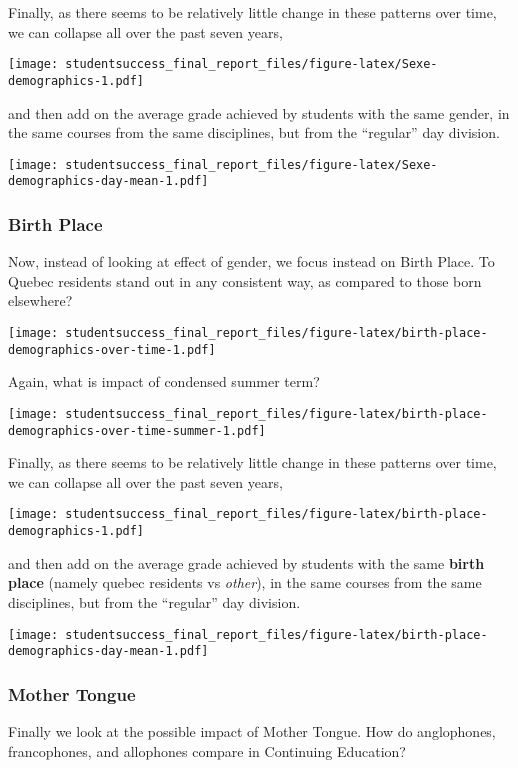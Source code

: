 \documentclass[]{book}
\theoremstyle{definition}
\theoremstyle{definition}
\theoremstyle{remark}
\begin{document}
Finally, as there seems to be relatively little change in these patterns
over time, we can collapse all over the past seven years,

\texttt{[image: studentsuccess\_final\_report\_files/figure-latex/Sexe-demographics-1.pdf]}

and then add on the average grade achieved by students with the same
gender, in the same courses from the same disciplines, but from the
``regular'' day division.

\texttt{[image: studentsuccess\_final\_report\_files/figure-latex/Sexe-demographics-day-mean-1.pdf]}

\subsubsection{Birth Place}\label{birth-place}

Now, instead of looking at effect of gender, we focus instead on Birth
Place. To Quebec residents stand out in any consistent way, as compared
to those born elsewhere?

\texttt{[image: studentsuccess\_final\_report\_files/figure-latex/birth-place-demographics-over-time-1.pdf]}

Again, what is impact of condensed summer term?

\texttt{[image: studentsuccess\_final\_report\_files/figure-latex/birth-place-demographics-over-time-summer-1.pdf]}

Finally, as there seems to be relatively little change in these patterns
over time, we can collapse all over the past seven years,

\texttt{[image: studentsuccess\_final\_report\_files/figure-latex/birth-place-demographics-1.pdf]}

and then add on the average grade achieved by students with the same
\textbf{birth place} (namely quebec residents vs \emph{other}), in the
same courses from the same disciplines, but from the ``regular'' day
division.

\texttt{[image: studentsuccess\_final\_report\_files/figure-latex/birth-place-demographics-day-mean-1.pdf]}

\subsubsection{Mother Tongue}\label{mother-tongue}

Finally we look at the possible impact of Mother Tongue. How do
anglophones, francophones, and allophones compare in Continuing
Education?
\end{document}
